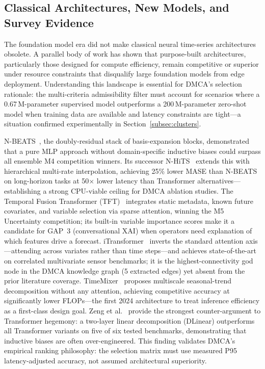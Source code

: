 \subsection{Classical Architectures, New Models, and Survey Evidence}
\label{subsec:ts-classical}

The foundation model era did not make classical neural time-series
architectures obsolete.
A parallel body of work has shown that purpose-built architectures,
particularly those designed for compute efficiency, remain competitive
or superior under resource constraints that disqualify large foundation
models from edge deployment.
Understanding this landscape is essential for DMCA's selection rationale:
the multi-criteria admissibility filter must account for scenarios where
a 0.67\,M-parameter supervised model outperforms a 200\,M-parameter
zero-shot model when training data are available and latency constraints
are tight—a situation confirmed experimentally in Section~\ref{subsec:clusters}.

N-BEATS~\cite{oreshkin2020nbeats}, the doubly-residual stack of
basis-expansion blocks, demonstrated that a pure MLP approach without
domain-specific inductive biases could surpass all ensemble M4
competition winners.
Its successor N-HiTS~\cite{challu2023nhits} extends this with
hierarchical multi-rate interpolation, achieving 25\% lower MASE than
N-BEATS on long-horizon tasks at 50$\times$ lower latency than
Transformer alternatives—establishing a strong CPU-viable ceiling for
DMCA ablation studies.
The Temporal Fusion Transformer (TFT)~\cite{lim2021tft} integrates
static metadata, known future covariates, and variable selection via
sparse attention, winning the M5 Uncertainty competition; its
built-in variable importance scores make it a candidate for GAP~3
(conversational XAI) when operators need explanation of which
features drive a forecast.
iTransformer~\cite{liu2024itransformer} inverts the standard attention
axis—attending across variates rather than time steps—and achieves
state-of-the-art on correlated multivariate sensor benchmarks; it is
the highest-connectivity god node in the DMCA knowledge graph (5
extracted edges) yet absent from the prior literature coverage.
TimeMixer~\cite{wang2024timemixer} proposes multiscale seasonal-trend
decomposition without any attention, achieving competitive accuracy at
significantly lower FLOPs—the first 2024 architecture to treat
inference efficiency as a first-class design goal.
Zeng et al.~\cite{zeng2023dlinear} provide the strongest counter-argument
to Transformer hegemony: a two-layer linear decomposition (DLinear)
outperforms all Transformer variants on five of six tested benchmarks,
demonstrating that inductive biases are often over-engineered.
This finding validates DMCA's empirical ranking philosophy:
the selection matrix must use measured P95 latency-adjusted accuracy, not
assumed architectural superiority.

